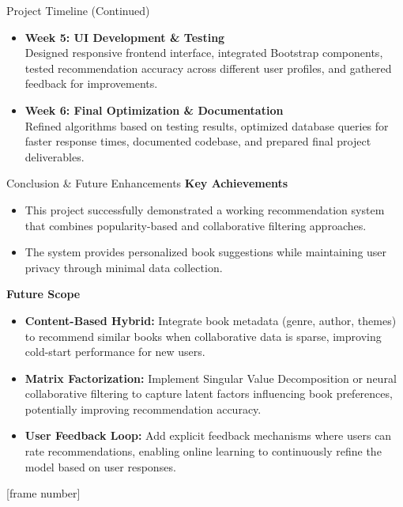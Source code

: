 \documentclass{beamer}
\begin{document}
\begin{frame}{Project Timeline (Continued)}
  \begin{itemize}
      \item \textbf{Week 5: UI Development \& Testing} \\ Designed responsive frontend interface, integrated Bootstrap components, tested recommendation accuracy across different user profiles, and gathered feedback for improvements.
      \item \textbf{Week 6: Final Optimization \& Documentation} \\ Refined algorithms based on testing results, optimized database queries for faster response times, documented codebase, and prepared final project deliverables.
  \end{itemize}
\end{frame}

\begin{frame}{Conclusion \& Future Enhancements}
  \textbf{Key Achievements}
  \begin{itemize}
      \item This project successfully demonstrated a working recommendation system that combines popularity-based and collaborative filtering approaches.
      \item The system provides personalized book suggestions while maintaining user privacy through minimal data collection.
  \end{itemize}
  
  \vspace{0.2cm}
  \textbf{Future Scope}
  \begin{itemize}
      \item \textbf{Content-Based Hybrid:} Integrate book metadata (genre, author, themes) to recommend similar books when collaborative data is sparse, improving cold-start performance for new users.
      \item \textbf{Matrix Factorization:} Implement Singular Value Decomposition or neural collaborative filtering to capture latent factors influencing book preferences, potentially improving recommendation accuracy.
      \item \textbf{User Feedback Loop:} Add explicit feedback mechanisms where users can rate recommendations, enabling online learning to continuously refine the model based on user responses.
  \end{itemize}
\end{frame}
[frame number]
\end{document}

